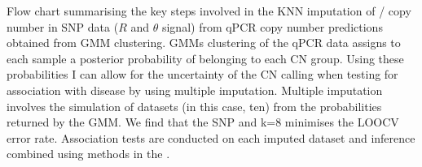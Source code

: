 {Flow chart summarising the key steps involved in the KNN imputation of / copy number in SNP data
($R$ and $\theta$ signal) from qPCR copy number predictions obtained from GMM clustering.}
{
\Glspl{GMM} clustering of the qPCR data assigns to each sample a posterior probability of belonging to each \gls{CN} group.
Using these probabilities I can allow for the uncertainty of the CN calling when testing for association with disease by using multiple imputation.
Multiple imputation involves the simulation of datasets (in this case, ten) from the probabilities returned by the GMM.
We find that the SNP  and k=8 minimises the \Gls{LOOCV} error rate.  
Association tests are conducted on each imputed dataset and inference combined using methods in the .
}



%
%


